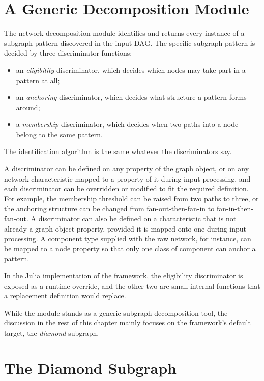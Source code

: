 \documentclass[12pt]{report}
\begin{document}
\section{A Generic Decomposition Module}
\label{sec:dd-genericity}

The network decomposition module identifies and returns every instance of a subgraph pattern discovered in the input DAG. The specific subgraph pattern is decided by three discriminator functions:
\begin{itemize}
\item an \emph{eligibility} discriminator, which decides which nodes may take part in a pattern at all;
\item an \emph{anchoring} discriminator, which decides what structure a pattern forms around;
\item a \emph{membership} discriminator, which decides when two paths into a node belong to the same pattern.
\end{itemize}
The identification algorithm is the same whatever the discriminators say.

A discriminator can be defined on any property of the graph object, or on any network characteristic mapped to a property of it during input processing, and each discriminator can be overridden or modified to fit the required definition. For example, the membership threshold can be raised from two paths to three, or the anchoring structure can be changed from fan-out-then-fan-in to fan-in-then-fan-out. A discriminator can also be defined on a characteristic that is not already a graph object property, provided it is mapped onto one during input processing. A component type supplied with the raw network, for instance, can be mapped to a node property so that only one class of component can anchor a pattern.

In the Julia implementation of the framework, the eligibility discriminator is exposed as a runtime override, and the other two are small internal functions that a replacement definition would replace.

While the module stands as a generic subgraph decomposition tool, the discussion in the rest of this chapter mainly focuses on the framework's default target, the \textit{diamond} subgraph.

\section{The Diamond Subgraph}
\label{sec:dd-diamond}
\end{document}
